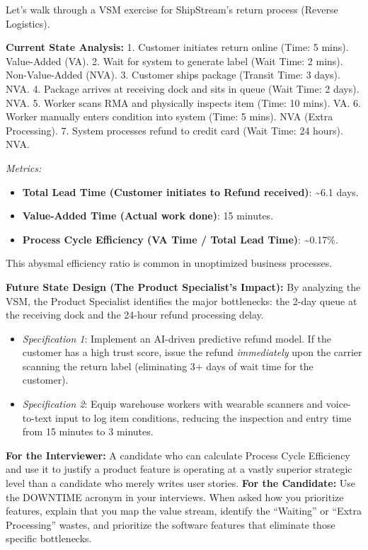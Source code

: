 \documentclass[
  11pt,
  openany,
  oneside]{book}
\providecommand{\tightlist}{%
  \setlength{\itemsep}{0pt}\setlength{\parskip}{0pt}}
\renewenvironment{quote}{\begin{customquote}}{\end{customquote}}
\begin{document}
Let's walk through a VSM exercise for ShipStream's return process
(Reverse Logistics).

\textbf{Current State Analysis:} 1. Customer initiates return online
(Time: 5 mins). Value-Added (VA). 2. Wait for system to generate label
(Wait Time: 2 mins). Non-Value-Added (NVA). 3. Customer ships package
(Transit Time: 3 days). NVA. 4. Package arrives at receiving dock and
sits in queue (Wait Time: 2 days). NVA. 5. Worker scans RMA and
physically inspects item (Time: 10 mins). VA. 6. Worker manually enters
condition into system (Time: 5 mins). NVA (Extra Processing). 7. System
processes refund to credit card (Wait Time: 24 hours). NVA.

\emph{Metrics:}

\begin{itemize}
\tightlist
\item
  \textbf{Total Lead Time (Customer initiates to Refund received)}:
  \textasciitilde6.1 days.
\item
  \textbf{Value-Added Time (Actual work done)}: 15 minutes.
\item
  \textbf{Process Cycle Efficiency (VA Time / Total Lead Time)}:
  \textasciitilde0.17\%.
\end{itemize}

This abysmal efficiency ratio is common in unoptimized business
processes.

\textbf{Future State Design (The Product Specialist's Impact):} By
analyzing the VSM, the Product Specialist identifies the major
bottlenecks: the 2-day queue at the receiving dock and the 24-hour
refund processing delay.

\begin{itemize}
\tightlist
\item
  \emph{Specification 1}: Implement an AI-driven predictive refund
  model. If the customer has a high trust score, issue the refund
  \emph{immediately} upon the carrier scanning the return label
  (eliminating 3+ days of wait time for the customer).
\item
  \emph{Specification 2}: Equip warehouse workers with wearable scanners
  and voice-to-text input to log item conditions, reducing the
  inspection and entry time from 15 minutes to 3 minutes.
\end{itemize}

\begin{quote}
\textbf{For the Interviewer:} A candidate who can calculate Process
Cycle Efficiency and use it to justify a product feature is operating at
a vastly superior strategic level than a candidate who merely writes
user stories. \textbf{For the Candidate:} Use the DOWNTIME acronym in
your interviews. When asked how you prioritize features, explain that
you map the value stream, identify the ``Waiting'' or ``Extra
Processing'' wastes, and prioritize the software features that eliminate
those specific bottlenecks.
\end{quote}
\end{document}
